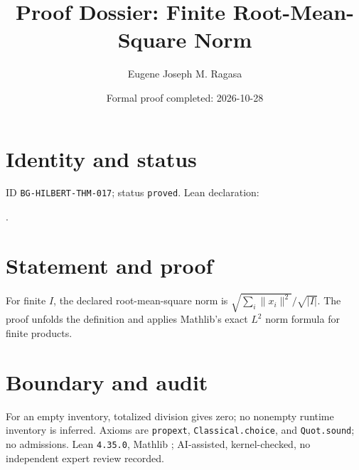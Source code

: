 \documentclass[11pt]{article}
\title{Proof Dossier: Finite Root-Mean-Square Norm}\author{Eugene Joseph M. Ragasa}\date{Formal proof completed: 2026-10-28}
\begin{document}
\raggedright\maketitle
\section{Identity and status}
ID \texttt{BG-HILBERT-THM-017}; status \texttt{proved}. Lean declaration:
\par{}.
\section{Statement and proof}
For finite $I$, the declared root-mean-square norm is $\sqrt{\sum_i\lVert x_i\rVert^2}/\sqrt{|I|}$. The proof unfolds the definition and applies Mathlib's exact $L^2$ norm formula for finite products.
\section{Boundary and audit}
For an empty inventory, totalized division gives zero; no nonempty runtime inventory is inferred. Axioms are \texttt{propext}, \texttt{Classical.choice}, and \texttt{Quot.sound}; no admissions. Lean \texttt{4.35.0}, Mathlib {\scriptsize{}}; AI-assisted, kernel-checked, no independent expert review recorded.
\end{document}
